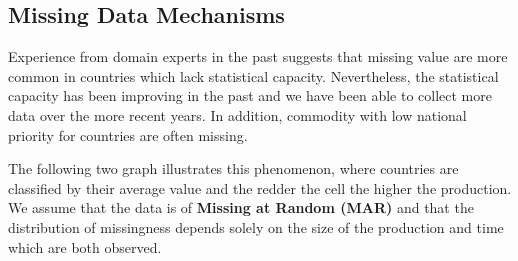 \documentclass[nojss]{jss}\usepackage[]{graphicx}\usepackage[]{color}
\begin{document}
\FloatBarrier
\subsection{Missing Data Mechanisms}

Experience from domain experts in the past suggests that missing value
are more common in countries which lack statistical
capacity. Nevertheless, the statistical capacity has been improving in
the past and we have been able to collect more data over the more
recent years. In addition, commodity with low national priority for
countries are often missing.

The following two graph illustrates this phenomenon, where countries
are classified by their average value and the redder the cell the
higher the production. We assume that the data is of \textbf{Missing
at Random (MAR)} and that the distribution of missingness depends
solely on the size of the production and time which are both observed.
\end{document}
